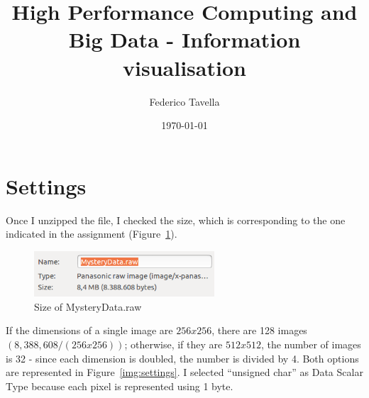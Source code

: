 \documentclass[a4paper]{article}
\title{High Performance Computing and Big Data - Information visualisation}
\author{Federico Tavella}
\date{\today}
\begin{document}
\maketitle

\section{Settings}

Once I unzipped the file, I checked the size, which is corresponding to the one indicated in the assignment (Figure~\ref{img:file_size}).

\begin{figure}[htbp]
\centering
\includegraphics[width=0.6\textwidth]{res/file_size.png}
\caption{Size of MysteryData.raw}
\label{img:file_size}
\end{figure}

If the dimensions of a single image are $256x256$, there are 128 images $(8,388,608/(256x256))$; otherwise, if they are $512x512$, the number of images is 32 - since each dimension is doubled, the number is divided by 4. Both options are represented in Figure~\ref{img:settings}.
I selected “unsigned char” as Data Scalar Type because each pixel is represented using 1 byte.
\end{document}
